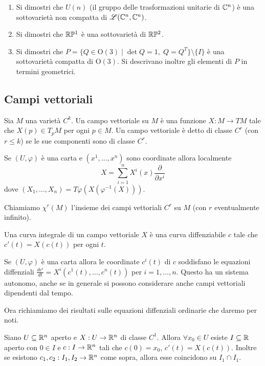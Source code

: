  \begin{exercise}
  \begin{enumerate}[label=\bf\Roman*)]
   \item Si dimostri che $U(n)$ (il gruppo delle trasformazioni unitarie di $\mathbb C^n$)
   è una sottovarietà non compatta di $\mathscr L(\mathbb C^n,\mathbb C^n)$.
   \item Si dimostri che $\mathbb R \mathbb P^1$ è una sottovarietà di $\mathbb R \mathbb P^2$.
   \item Si dimostri che $P=\{ Q\in \mathrm O(3)\;|\;\det Q=1,\; Q=Q^T\}\setminus\{I\}$
   è una sottovarietà compatta di $\mathrm O(3)$. Si descrivano inoltre gli elementi di $P$ in termini geometrici.
  \end{enumerate}
 \end{exercise}

 \subsection{Campi vettoriali}
 
 \begin{definition}
  Sia $M$ una varietà $C^k$. Un campo vettoriale su $M$ è una funzione $X:M\to TM$
  tale che $X(p)\in T_pM$ per ogni $p\in M$. Un campo vettoriale è detto di classe $C^r$
  (con $r\le k$) se le sue componenti sono di classe $C^r$.
 \end{definition}

 Se $(U,\varphi)$ è una carta e $(x^1,\dots,x^n)$ sono coordinate allora localmente
 $$X=\sum_{i=1}^nX^i(x)\frac{\partial}{\partial x^i}$$
 dove $(X_1,\dots,X_n)=T\varphi(X(\varphi^{-1}(X)))$.
 
 Chiamiamo $\chi^r(M)$ l'insieme dei campi vettoriali $C^r$ su $M$ (con $r$
 eventualmente infinito).
 
 \begin{definition}
  Una curva integrale di un campo vettoriale $X$ è una curva diffenziabile $c$ tale
  che $c'(t)=X(c(t))$ per ogni $t$.
 \end{definition}

 Se $(U,\varphi)$ è una carta allora le coordinate $c^i(t)$ di $c$ soddisfano le equazioni
 diffenziali $\frac{dc^i}{dt}=X^i(c^1(t),\dots,c^n(t))$ per $i=1,\dots,n$. Questo ha un
 sistema autonomo, anche se in generale si possono considerare anche campi vettoriali
 dipendenti dal tempo.
 
 Ora richiamiamo dei risultati sulle equazioni diffenziali ordinarie che daremo per noti.
 
 \begin{theorem}
  Siano $U\subseteq\mathbb R^n$ aperto e $X:U\to\mathbb R^n$ di classe $C^1$. Allora
  $\forall x_0\in U$ esiste $I\subseteq\mathbb R$ aperto con $0\in I$ e $c:I\to\mathbb R^n$
  tali che $c(0)=x_0$, $c'(t)=X(c(t))$. Inoltre se esistono $c_1,c_2:I_1,I_2\to\mathbb R^n$
  come sopra, allora esse coincidono su $I_1\cap I_1$.
 \end{theorem}

